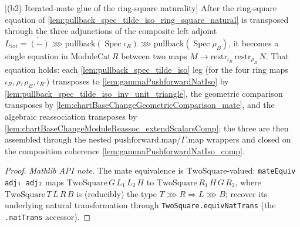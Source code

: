 \begin{lemma}

[(b2) Iterated-mate glue of the ring-square naturality]
  \label{lem:pullback_spec_tilde_iso_ring_square_mate_glue}
  After the ring-square equation of \cref{lem:pullback_spec_tilde_iso_ring_square_natural} is
  transposed through the three adjunctions of the composite left adjoint
  \(L_{\mathrm{tot}} = \widetilde{(-)} \ggg \mathrm{pullback}(\operatorname{Spec}\iota_R) \ggg
  \mathrm{pullback}(\operatorname{Spec}\rho_B)\), it becomes a single equation in
  \(\mathrm{ModuleCat}\,R\) between two maps \(M \to \mathrm{restr}_{\iota_R}\,\mathrm{restr}_{\rho_B}\,N\).
  That equation holds: each \cref{lem:pullback_spec_tilde_iso} leg (for the four ring maps
  \(\iota_R,\rho,\rho_B,\iota_{R'}\)) transposes to \cref{lem:gammaPushforwardNatIso} by
  \cref{lem:pullback_spec_tilde_iso_inv_unit_triangle}, the geometric comparison transposes by
  \cref{lem:chartBaseChangeGeometricComparison_mate}, and the algebraic reassociation transposes by
  \cref{lem:chartBaseChangeModuleReassoc_extendScalarsComp}; the three are then assembled through the
  nested \(\mathrm{pushforward}.\mathrm{map}\)/\(\Gamma.\mathrm{map}\) wrappers and closed on the
  composition coherence \cref{lem:gammaPushforwardNatIso_comp}.
  \begin{proof}
    \emph{Mathlib API note.} The mate equivalence is \(\mathrm{TwoSquare}\)-valued:
    \texttt{mateEquiv adj₁ adj₂} maps \(\mathrm{TwoSquare}\,G\,L_1\,L_2\,H\) to
    \(\mathrm{TwoSquare}\,R_1\,H\,G\,R_2\), where \(\mathrm{TwoSquare}\,T\,L\,R\,B\) is (reducibly) the
    type \(T \ggg R \Rightarrow L \ggg B\); recover its underlying natural transformation through
    \texttt{TwoSquare.equivNatTrans} (the \texttt{.natTrans} accessor).


\end{proof}
\end{lemma}
